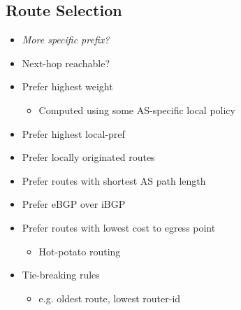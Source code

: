\subsection{Route Selection}
\begin{itemize}[nosep]
    \item \emph{More specific prefix?}
    \item Next-hop reachable?
    \item Prefer highest weight
          \begin{itemize}[nosep]
              \item Computed using some AS-specific local policy
          \end{itemize}
    \item Prefer highest local-pref
    \item Prefer locally originated routes
    \item Prefer routes with shortest AS path length
    \item Prefer eBGP over iBGP
    \item Prefer routes with lowest cost to egress point
          \begin{itemize}[nosep]
              \item Hot-potato routing
          \end{itemize}
    \item Tie-breaking rules
          \begin{itemize}[nosep]
              \item e.g. oldest route, lowest router-id
          \end{itemize}
\end{itemize}

